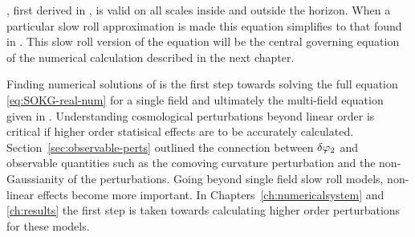 , first derived in , is valid on all scales
inside and outside the horizon. When a particular slow roll approximation is made
this equation simplifies to that found in . This slow roll
version of the equation will be the central governing equation of the numerical
calculation described in the next chapter.

Finding numerical solutions of  is the first step towards
solving the full equation \eqref{eq:SOKG-real-num} for a single field and
ultimately the multi-field equation given in . Understanding
cosmological perturbations beyond linear order is critical if higher order statisical
effects are to be accurately calculated. Section~\ref{sec:observable-perts}
outlined the connection between $\delta\varphi_{2}$ and observable quantities such as the
comoving curvature perturbation and the non-Gaussianity of the perturbations. Going
beyond single field slow roll models, non-linear effects become more important. In
Chapters~\ref{ch:numericalsystem} and \ref{ch:results} the first step is taken
towards calculating higher order perturbations for these models.
